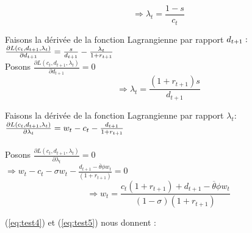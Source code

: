 \documentclass[11pt,twoside,a4paper]{article}
\begin{document}
\begin{equation}\label{eq:test4}
  \Rightarrow \lambda_t=\frac{1-s}{c_t}
\end{equation} 


Faisons la dérivée de la fonction Lagrangienne par rapport $d_{t+1} : \\ $
$\\
\frac{\partial L(c_t,d_{t+1},\lambda_t)}{\partial d_{t+1}} = \frac{s}{ d_{t+1}} - \frac{\lambda_t}{1+r_{t+1}} 
$\\

Posons  $ \frac{\partial L(c_t,d_{t+1},\lambda_t)}{\partial d_{t+1}} = 0 $ \\



  \begin{equation}\label{eq:test5}
  \Rightarrow \lambda_t=\frac{(1+r_{t+1})s}{ d_{t+1}}
\end{equation}  

Faisons la dérivée de la fonction Lagrangienne par rapport $\lambda_t :  $ \\
$\\
\frac{\partial L(c_t,d_{t+1},\lambda_t)}{\partial \lambda_t} = w_t-c_t - \frac{d_{t+1}}{1+r_{t+1}} 
$ \\ \\
Posons  $ \frac{\partial L(c_t,d_{t+1},\lambda_t)}{\partial \lambda_t} = 0 $ \\

$\Rightarrow w_t-c_t - \sigma w_t-\frac{d_{t+1}-\overline{\theta}\phi w_t}{(1+r_{t+1})}=0$\\

 \begin{equation}\label{eq:test6}
  \Rightarrow w_t = \frac{c_t(1+r_{t+1}) + d_{t+1}-\overline{\theta}\phi w_t}{(1-\sigma)(1+r_{t+1})}
\end{equation}
    

(\ref{eq:test4}) et (\ref{eq:test5}) nous donnent : \\
\end{document}
